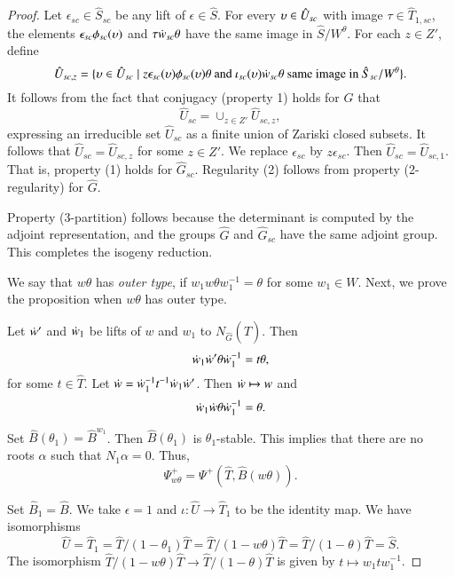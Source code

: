 \begin{proof}
Let $\epsilon_{sc}\in \hat S_{sc}$ be any lift of
$\epsilon\in \hat S$.  For every $\upsilon\in \hat U_{sc}$ with image
$\tau\in \hat T_{1,sc}$, the elements $\epsilon_{sc}\phi_{sc}(\upsilon)$
and $\tau\dot w_{sc}\theta$ have the same image in $\hat S/W^\theta$.
For each $z\in Z'$, define
\[
\hat U_{sc,z} = \{\upsilon \in \hat U_{sc}\mid 
z \epsilon_{sc}(\upsilon)\phi_{sc}(\upsilon)\theta\text{ and }
\iota_{sc}(\upsilon)\dot w_{sc}\theta \text{ same image in } \hat S_{sc}/W^\theta\}.
\]
 It follows from
the fact that conjugacy (property 1) holds for $\hat G$ that
\[
\hat U_{sc} = \cup_{z\in Z'} \hat U_{sc,z},
\]
expressing an irreducible set $\hat U_{sc}$ as a finite union of
Zariski closed subsets.  It follows that $\hat U_{sc} = \hat U_{sc,z}$
for some $z\in Z'$.  We replace $\epsilon_{sc}$ by $z\epsilon_{sc}$.
Then $\hat U_{sc} = \hat U_{sc,1}$.  That is, property (1) holds for
$\hat G_{sc}$.  Regularity (2) follows from property (2-regularity)
for $\hat G$.

Property (3-partition) follows because the determinant
is computed by the adjoint representation,  and the groups $\hat G$
and $\hat G_{sc}$ have the same adjoint group.
This completes the isogeny reduction.

We say that $w\theta$ has {\it outer type}, if $w_1 w \theta
w_1^{-1}=\theta$ for some $w_1\in W$.  Next, we prove the proposition
when $w\theta$ has outer type.

Let $\dot w'$ and $\dot w_1$ be lifts of $w$ and $w_1$ to $N_{\hat
  G}(\hat T)$.  Then
\[
\dot w_1 \dot w' \theta\dot w_1^{-1} = t\theta,
\]
for some $t\in \hat T$.  Let $\dot w = \dot w_1^{-1} t^{-1}
\dot w_1\dot w'$.  Then $\dot w\mapsto w$ and
\begin{equation}\label{eqn:outer}
\dot w_1\dot w \theta\dot w_1^{-1} = \theta.
\end{equation}

Set $\hat B(\theta_1) = \hat B^{w_1}$.  Then $\hat B(\theta_1)$ is
$\theta_1$-stable.  This implies that there are no roots $\alpha$ such
that $N_1\alpha=0$.  Thus,
\[
\Psi_{w\theta}^+ = 
\Psi^+(\hat T,\hat B(w\theta)).
\]

Set $\hat B_1 = \hat B$.  We take $\epsilon=1$ and $\iota:\hat
U\to\hat T_1$ to be the identity map.  We have isomorphisms
\begin{equation}
\hat U = \hat T_1 = \hat T/(1-\theta_1) \hat T 
= \hat T/(1-w \theta)\hat T 
= \hat T/(1-\theta)\hat T = \hat S.
\end{equation}
The isomorphism $\hat T/(1-w \theta)\hat T\to \hat T/(1-\theta)\hat T$
is given by $t \mapsto w_1 t w_1^{-1}$.


\end{proof}
